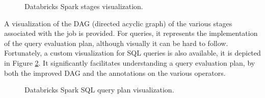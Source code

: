 \begin{figure}
   \begin{center}
   \end{center}
   \caption{Databricks Spark stages visualization.}
   \label{fig:databricksSparkGUIDAG}
\end{figure}

A visualization of the DAG (directed acyclic graph) of the various stages associated with the job is provided. For queries, it represents the implementation of the query evaluation plan, although visually it can be hard to follow. Fortunately, a custom visualization for SQL queries is also available, it is depicted in Figure \ref{fig:databricksSparkGUISQL}. It significantly facilitates understanding a query evaluation plan, by both the improved DAG and the annotations on the various operators.

\begin{figure}
   \begin{center}
   \end{center}
   \caption{Databricks Spark SQL query plan visualization.}
   \label{fig:databricksSparkGUISQL}
\end{figure}

